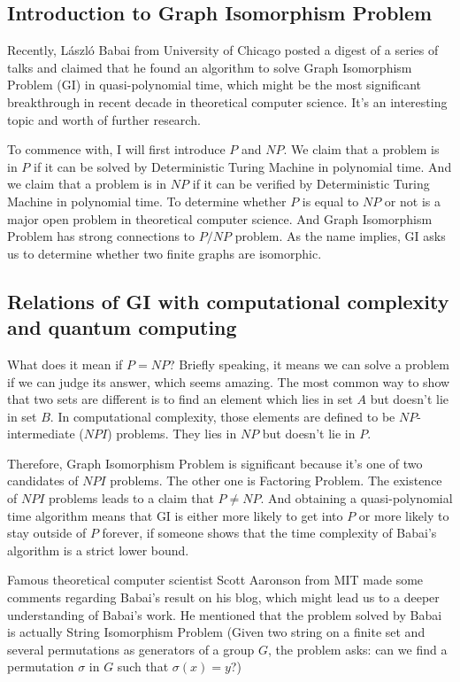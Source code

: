 \documentclass[12pt]{article}
\begin{document}
\subsection{Introduction to Graph Isomorphism Problem}
Recently, L\'{a}szl\'{o} Babai\cite{babai} from University of Chicago posted a digest of a series of talks and claimed that he found an algorithm to solve Graph Isomorphism Problem (GI) in quasi-polynomial time, which might be the most significant breakthrough in recent decade in theoretical computer science. It’s an interesting topic and worth of further research.

To commence with, I will first introduce $P$ and $NP$. We claim that a problem is in $P$ if it can be solved by Deterministic Turing Machine in polynomial time. And we claim that a problem is in $NP$ if it can be verified by Deterministic Turing Machine in polynomial time. To determine whether $P$ is equal to $NP$ or not is a major open problem in theoretical computer science. And Graph Isomorphism Problem has strong connections to $P/NP$ problem. As the name implies, GI asks us to determine whether two finite graphs are isomorphic.
\subsection{Relations of GI with computational complexity and quantum computing}
What does it mean if $P=NP$? Briefly speaking, it means we can solve a problem if we can judge its answer, which seems amazing. The most common way to show that two sets are different is to find an element which lies in set $A$ but doesn’t lie in set $B$. In computational complexity, those elements are defined to be $NP$-intermediate ($NPI$) problems. They lies in $NP$ but doesn’t lie in $P$. 

Therefore, Graph Isomorphism Problem is significant because it’s one of two candidates of $NPI$ problems. The other one is Factoring Problem. The existence of $NPI$ problems leads to a claim that $P\ne NP$. And obtaining a quasi-polynomial time algorithm means that GI is either more likely to get into $P$ or more likely to stay outside of $P$ forever, if someone shows that the time complexity of Babai’s algorithm is a strict lower bound. 

Famous theoretical computer scientist Scott Aaronson from MIT made some comments regarding Babai’s result on his blog\cite{aaronson}, which might lead us to a deeper understanding of Babai’s work. He mentioned that the problem solved by Babai is actually String Isomorphism Problem (Given two string on a finite set and several permutations as generators of a group $G$, the problem asks: can we find a permutation $\sigma$ in $G$ such that $\sigma(x)=y$?) 
\end{document}
